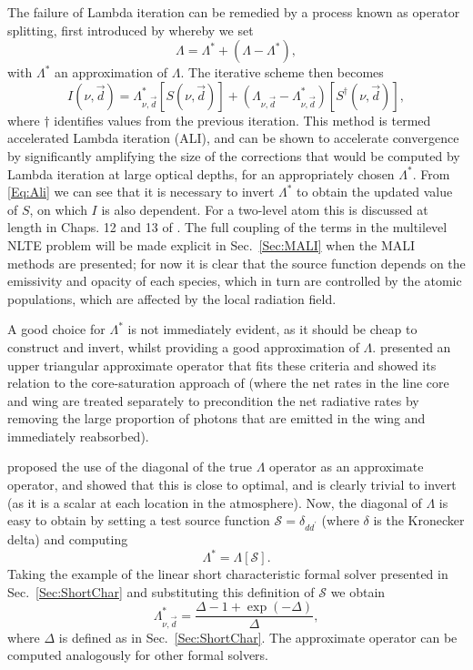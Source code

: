 The failure of Lambda iteration can be remedied by a process known as operator splitting, first introduced by \citet{Cannon1973} whereby we set
\begin{equation}
    \Lambda = \Lambda^* + (\Lambda - \Lambda^*),
\end{equation}
with $\Lambda^*$ an approximation of $\Lambda$. The iterative scheme then becomes
\begin{equation}
    I(\nu, \vec{d}) = \Lambda_{\nu, \vec{d}}^*[S(\nu, \vec{d})] + (\Lambda_{\nu, \vec{d}} - \Lambda_{\nu, \vec{d}}^*)[S^{\dagger}(\nu, \vec{d})],
    \label{Eq:Ali}
\end{equation}
where $\dagger$ identifies values from the previous iteration. This method is termed accelerated Lambda iteration (ALI), and can be shown to accelerate convergence by significantly amplifying the size of the corrections that would be computed by Lambda iteration at large optical depths, for an appropriately chosen $\Lambda^*$.
From \eqref{Eq:Ali} we can see that it is necessary to invert $\Lambda^*$ to obtain the updated value of $S$, on which $I$ is also dependent.
For a two-level atom this is discussed at length in Chaps. 12 and 13 of \citet{Hubeny2014}.
The full coupling of the terms in the multilevel NLTE problem will be made explicit in Sec.~\ref{Sec:MALI} when the MALI methods are presented; for now it is clear that the source function depends on the emissivity and opacity of each species, which in turn are controlled by the atomic populations, which are affected by the local radiation field.

A good choice for $\Lambda^*$ is not immediately evident, as it should be cheap to construct and invert, whilst providing a good approximation of $\Lambda$.
\citet{Scharmer1981} presented an upper triangular approximate operator that fits these criteria and showed its relation to the core-saturation approach of \citet{Rybicki1972} (where the net rates in the line core and wing are treated separately to precondition the net radiative rates by removing the large proportion of photons that are emitted in the wing and immediately reabsorbed).

\citet{Olson1986} proposed the use of the diagonal of the true $\Lambda$ operator as an approximate operator, and showed that this is close to optimal, and is clearly trivial to invert (as it is a scalar at each location in the atmosphere).
Now, the diagonal of $\Lambda$ is easy to obtain by setting a test source function $\mathcal{S}=\delta_{dd^\prime}$ (where $\delta$ is the Kronecker delta) and computing
\begin{equation}
    \Lambda^* = \Lambda[\mathcal{S}].
\end{equation}
Taking the example of the linear short characteristic formal solver presented in Sec.~\ref{Sec:ShortChar} and substituting this definition of $\mathcal{S}$ we obtain
\begin{equation}
    \Lambda^*_{\nu, \vec{d}} = \frac{\Delta - 1 + \exp(-\Delta)}{\Delta},
\end{equation}
where $\Delta$ is defined as in Sec.~\ref{Sec:ShortChar}.
The approximate operator can be computed analogously for other formal solvers.

